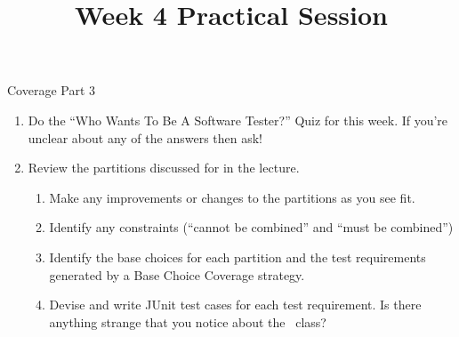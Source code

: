 



\title{Week 4 Practical Session}{Coverage Part 3}

\begin{enumerate}

    \item Do the ``Who Wants To Be A Software Tester?'' Quiz for this week.
    If you're unclear about any of the answers then ask!

    \item Review the partitions discussed for \triangleclass in the lecture.
    
    \begin{enumerate}
        \item Make any improvements or changes to the partitions as you see fit.
        
        \item Identify any constraints (``cannot be combined'' and ``must be combined'')
        
        \item Identify the base choices for each partition and the test
        requirements generated by a Base Choice Coverage strategy.

        \item Devise and write JUnit test cases for each test requirement. Is
        there anything strange that you notice about the \triangleclass~class?
    \end{enumerate}

\end{enumerate}

